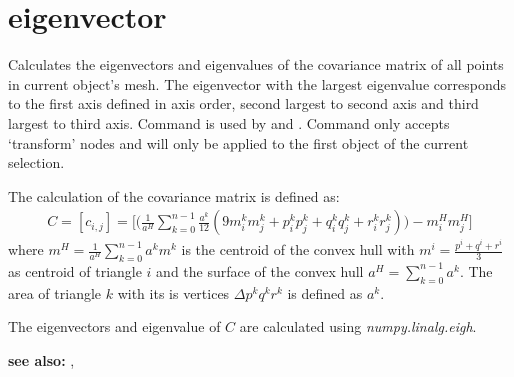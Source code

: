 \documentclass[letterpaper,10pt,english]{sphinxmanual}
\begin{document}
\section{eigenvector}
\label{pk_src.eigenvector::doc}\label{pk_src.eigenvector:eigenvector}\label{pk_src.eigenvector:id1}
{\hyperref[index:commands]{}}
\label{pk_src.eigenvector:module-pk_src.eigenvector}
Calculates the eigenvectors and eigenvalues of the covariance matrix of all points in current object's mesh. The eigenvector with the largest eigenvalue corresponds to the first axis defined in axis order, second largest to second axis and third largest to third axis. Command is used by {\hyperref[pk_src.alignObj:alignobj]{}} and {\hyperref[pk_src.exportData:exportdata]{}}.
Command only accepts `transform' nodes and will only be applied to the first object of the current selection.

The calculation of the covariance matrix is defined as:
\begin{equation*}
\begin{split}C = [c_{i,j}] = \biggl[ \biggl (  \frac{1}{a^H}\sum\limits_{k=0}^{n-1}\frac{a^k}{12}(9m_i^km_j^k + p_i^kp_j^k + q_i^kq_j^k + r_i^kr_j^k) \biggr ) - m_i^Hm_j^H \biggr]\end{split}
\end{equation*}
where \(m^H = \frac {1}{a^H}\sum\limits_{k=0}^{n-1}a^km^k\) is the centroid of the convex hull with \(m^i = \frac{p^i+q^i+r^i}3\) as centroid of triangle \(i\) and the surface of the convex hull \(a^H = \sum\limits_{k=0}^{n-1}a^k\). The area of triangle \(k\) with its is vertices \(\Delta p^kq^kr^k\) is defined as \(a^k\).

The eigenvectors and eigenvalue of \(C\) are calculated using \emph{numpy.linalg.eigh}.

\textbf{see also:} {\hyperref[pk_src.alignObj:alignobj]{}}, {\hyperref[pk_src.exportData:exportdata]{}}
\end{document}

